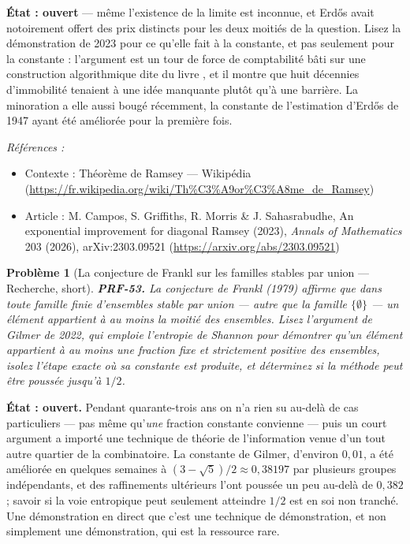 \documentclass[11pt]{article}
\newtheorem{problem}{Problème}
\newenvironment{refs}{\par\small\noindent\emph{Références :}\begin{itemize}\setlength\itemsep{0pt}}{\end{itemize}\normalsize}
\begin{document}
\noindent \textbf{État : ouvert} --- même l'existence de la limite est inconnue, et
Erd\H{o}s avait notoirement offert des prix distincts pour les deux moitiés de la question. Lisez
la démonstration de 2023 pour ce qu'elle fait à la constante, et pas seulement pour la
constante : l'argument est un tour de force de comptabilité bâti sur une construction
algorithmique dite \og{} du livre \fg{}, et il montre que huit décennies d'immobilité tenaient à une
idée manquante plutôt qu'à une barrière. La minoration a elle aussi bougé récemment, la
constante de l'estimation d'Erd\H{o}s de 1947 ayant été améliorée pour la première fois.

\begin{refs}
\item Contexte : Théorème de Ramsey --- Wikipédia (\url{https://fr.wikipedia.org/wiki/Th%C3%A9or%C3%A8me_de_Ramsey})
\item Article : M. Campos, S. Griffiths, R. Morris \& J. Sahasrabudhe, \og{} An exponential improvement for diagonal Ramsey \fg{} (2023), \textit{Annals of Mathematics} 203 (2026), arXiv:2303.09521 (\url{https://arxiv.org/abs/2303.09521})
\end{refs}

\bigskip

\begin{problem}[{La conjecture de Frankl sur les familles stables par union --- Recherche, short}]
\textbf{PRF-53.} La conjecture de Frankl (1979) affirme que dans toute
famille finie d'ensembles stable par union --- autre que la famille $ \{\emptyset\} $ --- un
élément appartient à au moins la moitié des ensembles. Lisez l'argument de Gilmer de 2022,
qui emploie l'entropie de Shannon pour démontrer qu'un élément appartient à au moins une
fraction fixe et strictement positive des ensembles, isolez l'étape exacte où sa constante
est produite, et déterminez si la méthode peut être poussée jusqu'à $ 1/2 $.
\end{problem}

\noindent \textbf{État : ouvert.} Pendant quarante-trois ans on n'a rien su au-delà de
cas particuliers --- pas même qu'\textit{une} fraction constante convienne --- puis un court
argument a importé une technique de théorie de l'information venue d'un tout autre quartier
de la combinatoire. La constante de Gilmer, d'environ $ 0{,}01 $, a été améliorée en quelques
semaines à $ (3-\sqrt5)/2 \approx 0{,}38197 $ par plusieurs groupes indépendants, et des
raffinements ultérieurs l'ont poussée un peu au-delà de $ 0{,}382 $ ; savoir si la voie
entropique peut seulement atteindre $ 1/2 $ est en soi non tranché. Une démonstration en
direct que c'est une technique de démonstration, et non simplement une démonstration, qui est
la ressource rare.
\end{document}
